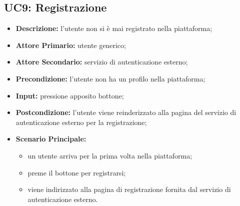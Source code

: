 \subsection{UC9: Registrazione}
\label{sec:UC9}
\begin{itemize}
    \item \textbf{Descrizione:} l'utente non si è mai registrato nella piattaforma;
    \item \textbf{Attore Primario:} utente generico;
    \item \textbf{Attore Secondario:} servizio di autenticazione esterno;
    \item \textbf{Precondizione:} l'utente non ha un profilo nella piattaforma;
    \item \textbf{Input:} pressione apposito bottone;
    \item \textbf{Postcondizione:} l'utente viene reinderizzato alla pagina  del servizio di autenticazione esterno per la registrazione;
    \item \textbf{Scenario Principale:}
          \begin{itemize}
              \item un utente arriva per la prima volta nella piattaforma;
              \item preme il bottone per registrarsi;
              \item viene indirizzato alla pagina di registrazione fornita dal servizio di autenticazione esterno.
          \end{itemize}
\end{itemize}